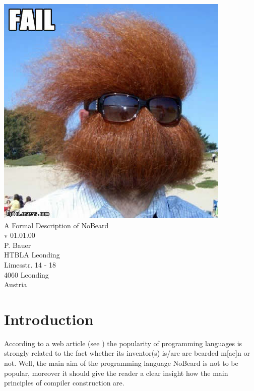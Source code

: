 \documentclass[11pt]{report}
\author{P. Bauer}
\date{V.\_01.00.00}                                           %
\newcommand{\leongage}{NoBeard}
\begin{document}
\begin{titlepage}
\begin{center}
\includegraphics[scale=0.3]{no_beard_1.jpg} \\[2em]
{\Huge A Formal Description of \leongage} \\[1em]
{\large v 01.01.00} \\[2em]
{\Large P. Bauer} \\[1em]
HTBLA Leonding \\
Limesstr. 14 - 18 \\
4060 Leonding \\
Austria
\end{center}
\end{titlepage}

\tableofcontents
\chapter{Introduction}
According to a web article (see \cite{khason:2008}) the popularity of programming languages is strongly related to the fact whether its inventor(s) is/are are bearded m[ae]n or not. Well, the main aim of the programming language \leongage{} is not to be popular,
moreover it should give the reader a clear insight how the main principles of compiler construction are.
\end{document}
